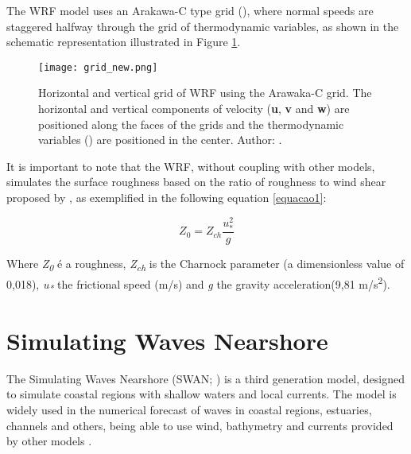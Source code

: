 \noindent The WRF model uses an Arakawa-C type grid (\cite{Arakawa1977}), where normal speeds are staggered halfway through the grid of thermodynamic variables, as shown in the 
schematic representation illustrated in Figure \textcolor{bleu_cite}{\ref{gradeswrf}}.
\bigskip

\begin{figure}[H]
    \centering
    \texttt{[image: grid\_new.png]}
    \caption{Horizontal and vertical grid of WRF using the Arawaka-C grid. The horizontal and vertical components
                        of velocity (\textbf{u}, \textbf{v} and \textbf{w}) are positioned along the faces of the grids and the thermodynamic variables
                        (\straighttheta) are positioned in the center. \newline Author: \textcite{Skamarock2008}.}
    \label{gradeswrf}
\end{figure}
\bigskip

\noindent It is important to note that the WRF, without coupling with other models, simulates the surface roughness based on the ratio of roughness to wind 
shear proposed by \textcite{Charnock1955}, as exemplified in the following equation \textcolor{bleu_cite}{\ref{equacao1}}:
\bigskip

\begin{equation}
Z_{0} = Z_{ch} \frac{u_{*}^{2}}{g}
\label{equacao1}
\end{equation}

\bigskip

\noindent Where \textit{Z\textsubscript{0}} é a roughness, \textit{Z\textsubscript{ch}} is the Charnock parameter (a dimensionless value of 0,018), \textit{u\textsubscript{*}} 
the frictional speed (m/s) and \textit{g} the gravity acceleration(9,81 m/s\textsuperscript{2}).
\bigskip



\section{Simulating Waves Nearshore}\label{swansecao}
\bigskip

\noindent The Simulating Waves Nearshore (SWAN; \cite{Booij1999, Booij1996}) is a third generation model,
designed to simulate coastal regions with shallow waters and local currents. The model is widely used in the numerical forecast of waves in coastal regions, estuaries,  channels and 
others, being able to use wind, bathymetry and currents provided by other models \parencite{Booij1999, Booij1996}.
\bigskip

